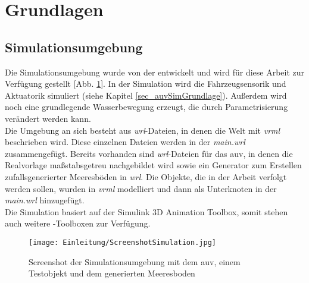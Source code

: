 \cleardoublepage
\section{Grundlagen}
\subsection{Simulationsumgebung}
Die Simulationsumgebung wurde von der \atlas entwickelt und wird für diese Arbeit zur Verfügung gestellt [Abb. \ref{screenSim}].
In der Simulation wird die Fahrzeugsensorik und Aktuatorik simuliert (siehe Kapitel \ref{sec_auvSimGrundlage}). Außerdem wird noch eine grundlegende Wasserbewegung erzeugt, die durch Parametrisierung verändert werden kann.\\

Die Umgebung an sich besteht aus \textit{wrl}-Dateien, in denen die Welt mit \textit{\gls{vrml}} beschrieben wird. Diese einzelnen Dateien werden in der \textit{main.wrl} zusammengefügt. Bereits vorhanden sind \textit{wrl}-Dateien für das \gls{auv}, in denen die Realvorlage maßstabsgetreu nachgebildet wird sowie ein Generator zum Erstellen zufallsgenerierter Meeresböden in \textit{wrl}. Die Objekte, die in der Arbeit verfolgt werden sollen, wurden in \textit{\gls{vrml}} modelliert und dann als Unterknoten in der \textit{main.wrl} hinzugefügt.\\
Die Simulation basiert auf der \matlab Simulink 3D Animation Toolbox, somit stehen auch weitere \matlab -Toolboxen zur Verfügung. 
\begin{figure}[H]
\texttt{[image: Einleitung/ScreenshotSimulation.jpg]}
\caption[Screenshot der Simulationsumgebung]{Screenshot der Simulationsumgebung mit dem \gls{auv}, einem Testobjekt und dem generierten Meeresboden}
\label{screenSim}
\end{figure}
